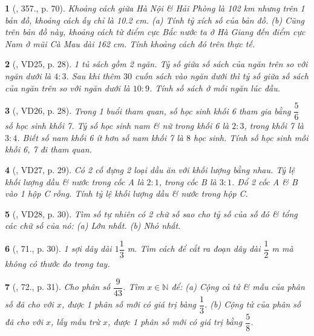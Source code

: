 \documentclass{article}
\newtheorem{baitoan}{}
\begin{document}
\begin{baitoan}[\cite{Tuyen_Toan_6}, 357., p. 70]
	Khoảng cách giữa Hà Nội \& Hải Phòng là {\rm102 km} nhưng trên 1 bản đồ, khoảng cách ấy chỉ là {\rm10.2 cm}. (a) Tính tỷ xích số của bản đồ. (b) Cũng trên bản đồ này, khoảng cách từ điểm cực Bắc nước ta ở Hà Giang đến điểm cực Nam ở mũi Cà Mau dài {\rm162 cm}. Tính khoảng cách đó trên thực tế.
\end{baitoan}

\begin{baitoan}[\cite{Binh_Toan_6_tap_2}, VD25, p. 28]
	1 tủ sách gồm 2 ngăn. Tỷ số giữa số sách của ngăn trên so với ngăn dưới là $4:3$. Sau khi thêm $30$ cuốn sách vào ngăn dưới thì tỷ số giữa số sách của ngăn trên so với ngăn dưới là $10:9$. Tính số sách ở mỗi ngăn lúc đầu.
\end{baitoan}

\begin{baitoan}[\cite{Binh_Toan_6_tap_2}, VD26, p. 28]
	Trong 1 buổi tham quan, số học sinh khối 6 tham gia bằng $\dfrac{5}{6}$ số học sinh khối 7. Tỷ số học sinh nam \& nữ trong khối 6 là $2:3$, trong khối 7 là $3:4$. Biết số nam khối 6 ít hơn số nam khối 7 là $8$ học sinh. Tính số học sinh mỗi khối 6, 7 đi tham quan.
\end{baitoan}

\begin{baitoan}[\cite{Binh_Toan_6_tap_2}, VD27, p. 29]
	Có 2 cố đựng 2 loại dầu ăn với khối lượng bằng nhau. Tỷ lệ khối lượng dầu \& nước trong cốc A là $2:1$, trong cốc B là $3:1$. Đổ 2 cốc A \& B vào 1 hộp C rỗng. Tính tỷ lệ khối lượng dầu \& nước trong hộp C.
\end{baitoan}

\begin{baitoan}[\cite{Binh_Toan_6_tap_2}, VD28, p. 30]
	Tìm số tự nhiên có 2 chữ số sao cho tỷ số của số đó \& tổng các chữ số của nó: (a) Lớn nhất. (b) Nhỏ nhất.
\end{baitoan}

\begin{baitoan}[\cite{Binh_Toan_6_tap_2}, 71., p. 30]
	1 sợi dây dài $1\dfrac{1}{3}$ {\rm m}. Tìm cách để cắt ra đoạn dây dài $\dfrac{1}{2}$ {\rm m} mà không có thước đo trong tay.
\end{baitoan}

\begin{baitoan}[\cite{Binh_Toan_6_tap_2}, 72., p. 31]
	Cho phân số $\dfrac{9}{43}$. Tìm $x\in\mathbb{N}$ để: (a) Cộng cả tử \& mẫu của phân số đã cho với $x$, được 1 phân số mới có giá trị bàng $\dfrac{1}{3}$. (b) Cộng tử của phân số đã cho với $x$, lấy mẫu trừ $x$, được 1 phân số mới có giá trị bằng $\dfrac{5}{8}$.
\end{baitoan}
\end{document}
